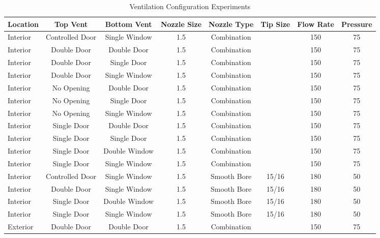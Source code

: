 \documentclass{article}
\begin{document}


\begin{table}[!ht]
\centering
\footnotesize
\caption{Ventilation Configuration Experiments}
\label{Ventilation_Configuration_Experiments}
\begin{tabular}{lccccccc}
\toprule[1.5pt]
Location & Top Vent & Bottom Vent & Nozzle Size & Nozzle Type & Tip Size & Flow Rate & Pressure \\ 
\midrule
Interior & Controlled Door & Single Window & 1.5 & Combination &  & 150 & 75 \\
Interior & Double Door & Double Door & 1.5 & Combination &  & 150 & 75 \\
Interior & Double Door & Single Door & 1.5 & Combination &  & 150 & 75 \\
Interior & Double Door & Single Window & 1.5 & Combination &  & 150 & 75 \\
Interior & No Opening & Double Door & 1.5 & Combination &  & 150 & 75 \\
Interior & No Opening & Single Door & 1.5 & Combination &  & 150 & 75 \\
Interior & No Opening & Single Window & 1.5 & Combination &  & 150 & 75 \\
Interior & Single Door & Double Door & 1.5 & Combination &  & 150 & 75 \\
Interior & Single Door & Single Door & 1.5 & Combination &  & 150 & 75 \\
Interior & Single Door & Double Window & 1.5 & Combination &  & 150 & 75 \\
Interior & Single Door & Single Window & 1.5 & Combination &  & 150 & 75 \\
Interior & Controlled Door & Single Window & 1.5 & Smooth Bore & 15/16 & 180 & 50 \\
Interior & Double Door & Single Window & 1.5 & Smooth Bore & 15/16 & 180 & 50 \\
Interior & Single Door & Double Window & 1.5 & Smooth Bore & 15/16 & 180 & 50 \\
Interior & Single Door & Single Window & 1.5 & Smooth Bore & 15/16 & 180 & 50 \\
Exterior & Double Door & Double Door & 1.5 & Combination &  & 150 & 75 \\

\end{tabular}
\end{table}
\end{document}
